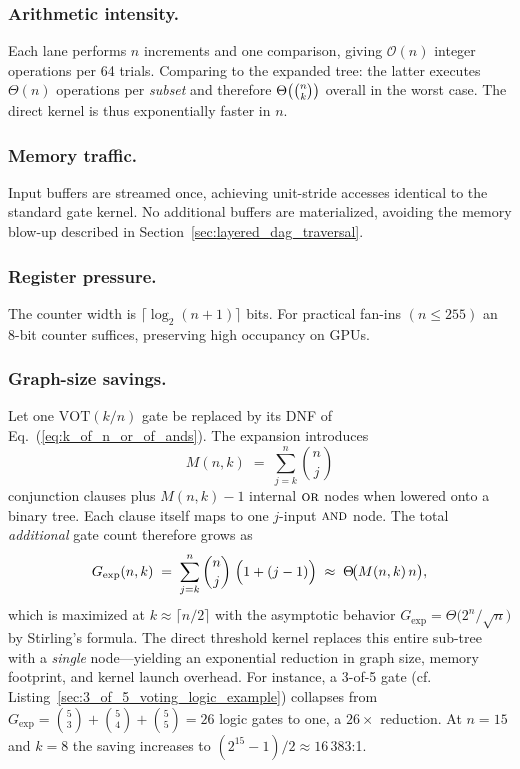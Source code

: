 \subsubsection{Arithmetic intensity.}  Each lane performs $n$ increments and one
comparison, giving $\mathcal{O}(n)$ integer operations per 64 trials.
Comparing to the expanded tree: the latter executes $\Theta(n)$ operations per
\emph{subset} and therefore $\Theta\bigl(\tbinom{n}{k}\bigr)$ overall in the
worst case.  The direct kernel is thus exponentially faster in $n$.

\subsubsection{Memory traffic.}  Input buffers are streamed once, achieving
unit-stride accesses identical to the standard gate kernel.  No additional
buffers are materialized, avoiding the memory blow-up described in
Section~\ref{sec:layered_dag_traversal}.

\subsubsection{Register pressure.}  The counter width is $\lceil\log_2(n+1)\rceil$
bits.  For practical fan-ins $(n\le 255)$ an 8-bit counter suffices, preserving
high occupancy on GPUs.

\subsubsection{Graph-size savings.}  Let one $\mathrm{VOT}(k/n)$ gate be
replaced by its DNF of Eq.~(\ref{eq:k_of_n_or_of_ands}).  The expansion
introduces
\[
  M(n,k) \;=\; \sum_{j=k}^{n} \binom{n}{j}
\]
conjunction clauses plus $M(n,k)-1$ internal $\textsc{or}$ nodes when lowered
onto a binary tree.
Each clause itself maps to one $j$-input $\textsc{and}$ node.  The total
\emph{additional} gate count therefore grows as
\[
  G_{\text{exp}}(n,k) \;=\; \sum_{j=k}^{n} \binom{n}{j}\;\Bigl(1 + (j-1)\Bigr)
  \;\approx\; \Theta\!\bigl(M(n,k)\,n\bigr),
\]
which is maximized at $k\approx\lceil n/2\rceil$ with the asymptotic
behavior $G_{\text{exp}}=\Theta\!\bigl(2^{n}/\sqrt{n}\bigr)$ by Stirling’s
formula.  The direct threshold kernel replaces this entire sub-tree with a
\emph{single} node—yielding an exponential reduction in graph size, memory
footprint, and kernel launch overhead.  For instance, a 3-of-5 gate (cf.
Listing~\ref{sec:3_of_5_voting_logic_example}) collapses from
$G_{\text{exp}}=\binom{5}{3}+\binom{5}{4}+\binom{5}{5}=26$ logic gates to
one, a $26\times$ reduction.  At $n=15$ and $k=8$ the saving increases to
$(2^{15}-1)/2 \approx 16\,383$:1.

